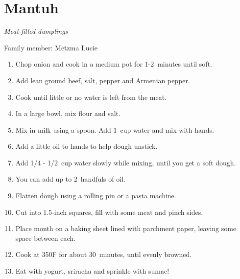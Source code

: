 \chapter{Mantuh}
\label{ch:mantuh}


\textit{Meat-filled dumplings}

Family member: Metzma Lucie

\begin{enumerate}
    \item Chop onion and cook in a medium pot for 1-2~minutes until soft.
    \item Add lean ground beef, salt, pepper and Armenian pepper.
    \item Cook until little or no water is left from the meat.

    \item In a large bowl, mix flour and salt.
    \item Mix in milk using a spoon. Add 1~cup water and mix with hands.
    \item Add a little oil to hands to help dough unstick.
    \item Add 1/4 - 1/2~cup water slowly while mixing, until you get a soft dough.
    \item You can add up to 2~handfuls of oil.

    \item Flatten dough using a rolling pin or a pasta machine.
    \item Cut into 1.5-inch squares, fill with some meat and pinch sides.
    \item Place month on a baking sheet lined with parchment paper, leaving some space between each.
    \item Cook at 350\degree F for about 30~minutes, until evenly browned.
    \item Eat with yogurt, sriracha and sprinkle with sumac!
\end{enumerate}

